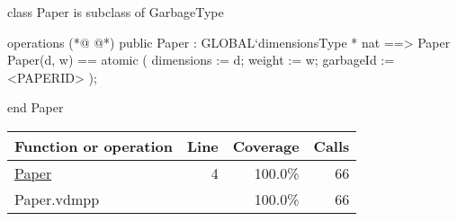 \begin{vdmpp}[breaklines=true]
class Paper is subclass of GarbageType

operations
(*@
\label{Paper:4}
@*)
public Paper : GLOBAL`dimensionsType * nat ==> Paper
Paper(d, w) == 
    atomic 
    (
        dimensions := d;
        weight := w;
        garbageId := <PAPERID>
    );


end Paper
\end{vdmpp}
\bigskip
\begin{longtable}{|l|r|r|r|}
\hline
Function or operation & Line & Coverage & Calls \\
\hline
\hline
\hyperref[Paper:4]{Paper} & 4&100.0\% & 66 \\
\hline
\hline
Paper.vdmpp & & 100.0\% & 66 \\
\hline
\end{longtable}

